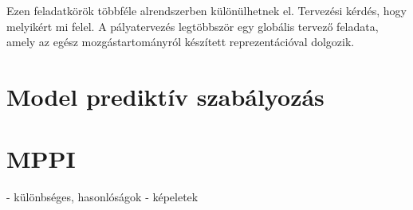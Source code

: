 Ezen feladatkörök többféle alrendszerben különülhetnek el. Tervezési kérdés, hogy melyikért mi felel.
A pályatervezés legtöbbször egy globális tervező feladata, amely az egész mozgástartományról készített reprezentációval dolgozik.

\section{Model prediktív szabályozás}
\section{MPPI}
- különbséges, hasonlóságok
- képeletek
\section{}